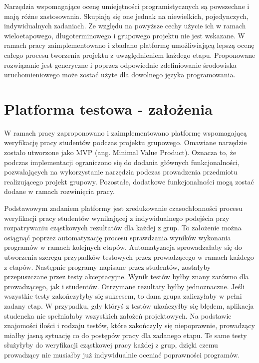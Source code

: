 Narzędzia wspomagające ocenę umiejętności programistycznych są powszechne i mają różne zastosowania.
Skupiają się one jednak na niewielkich, pojedynczych, indywidualnych zadaniach.
Ze względu na powyższe cechy użycie ich w ramach wieloetapowego, długoterminowego i grupowego projektu nie jest wskazane.
W ramach pracy zaimplementowano i zbadano platformę umożliwiającą lepszą ocenę całego procesu tworzenia projektu z uwzględnieniem każdego etapu.
Proponowane rozwiązanie jest generyczne i poprzez odpowiednie zdefiniowanie środowiska uruchomieniowego może zostać użyte dla dowolnego języka programowania.

\vfill


\section{Platforma testowa - założenia}

W ramach pracy zaproponowano i zaimplementowano platformę wspomagającą weryfikację pracy studentów podczas projektu grupowego. 
Omawiane narzędzie zostało utworzone jako MVP (ang. Minimal Value Product). 
Oznacza to, że podczas implementacji ograniczono się do dodania głównych funkcjonalności, pozwalających na wykorzystanie narzędzia podczas prowadzenia przedmiotu realizującego projekt grupowy.
Pozostałe, dodatkowe funkcjonalności mogą zostać dodane w ramach rozwinięcia pracy.

Podstawowym zadaniem platformy jest zredukowanie czasochłonności procesu weryfikacji pracy studentów wynikającej z indywidualnego podejścia przy rozpatrywaniu cząstkowych rezultatów dla każdej z grup.
To założenie można osiągnąć poprzez automatyzację procesu sprawdzania wyników wykonania programów w ramach kolejnych etapów.
Automatyzacja sprowadzałaby się do utworzenia szeregu przypadków testowych przez prowadzącego w ramach każdego z etapów.
Następnie programy napisane przez studentów, zostałyby przepuszczane przez testy akceptacyjne.
Wynik testów byłby znany zarówno dla prowadzącego, jak i studentów.
Otrzymane rezultaty byłby jednoznaczne.
Jeśli wszystkie testy zakończyłyby się sukcesem, to dana grupa zaliczyłaby w pełni zadany etap.
W przypadku, gdy któryś z testów ukończyłby się błędem, aplikacja studencka nie spełniałaby wszystkich założeń projektowych.
Na podstawie znajomości ilości i rodzaju testów, które zakończyły się niepoprawnie, prowadzący miałby jasną sytuację co do postępów pracy dla zadanego etapu.
Te same testy służyłyby do weryfikacji cząstkowej pracy każdej z grup, dzięki czemu prowadzący nie musiałby już indywidualnie oceniać poprawności programów.

